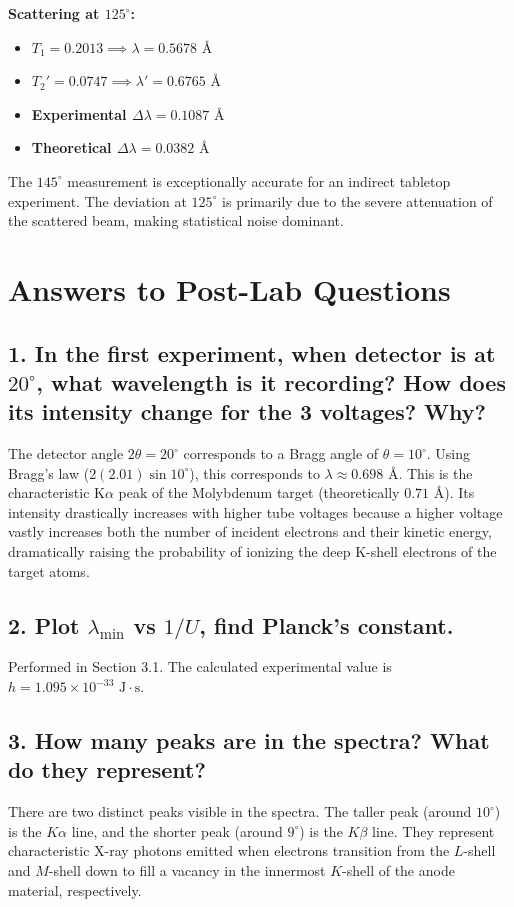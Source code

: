\documentclass[a4paper,11pt]{article}
\begin{document}
\textbf{Scattering at $125^\circ$:}
\begin{itemize}
    \item $T_1 = 0.2013 \implies \lambda = 0.5678\text{ \AA}$
    \item $T_2' = 0.0747 \implies \lambda' = 0.6765\text{ \AA}$
    \item \textbf{Experimental $\Delta\lambda = 0.1087\text{ \AA}$}
    \item \textbf{Theoretical $\Delta\lambda = 0.0382\text{ \AA}$}
\end{itemize}
The $145^\circ$ measurement is exceptionally accurate for an indirect tabletop experiment. The deviation at $125^\circ$ is primarily due to the severe attenuation of the scattered beam, making statistical noise dominant.

\section{Answers to Post-Lab Questions}

\subsection*{1. In the first experiment, when detector is at $20^\circ$, what wavelength is it recording? How does its intensity change for the 3 voltages? Why?}
The detector angle $2\theta = 20^\circ$ corresponds to a Bragg angle of $\theta = 10^\circ$. Using Bragg's law ($2(2.01) \sin 10^\circ$), this corresponds to $\lambda \approx 0.698\text{ \AA}$. This is the characteristic K$\alpha$ peak of the Molybdenum target (theoretically $0.71\text{ \AA}$). Its intensity drastically increases with higher tube voltages because a higher voltage vastly increases both the number of incident electrons and their kinetic energy, dramatically raising the probability of ionizing the deep K-shell electrons of the target atoms.

\subsection*{2. Plot $\lambda_{\text{min}}$ vs $1/U$, find Planck's constant.}
Performed in Section 3.1. The calculated experimental value is $h = 1.095 \times 10^{-33}\text{ J}\cdot\text{s}$.

\subsection*{3. How many peaks are in the spectra? What do they represent?}
There are two distinct peaks visible in the spectra. The taller peak (around $10^\circ$) is the $K\alpha$ line, and the shorter peak (around $9^\circ$) is the $K\beta$ line. They represent characteristic X-ray photons emitted when electrons transition from the $L$-shell and $M$-shell down to fill a vacancy in the innermost $K$-shell of the anode material, respectively.
\end{document}
